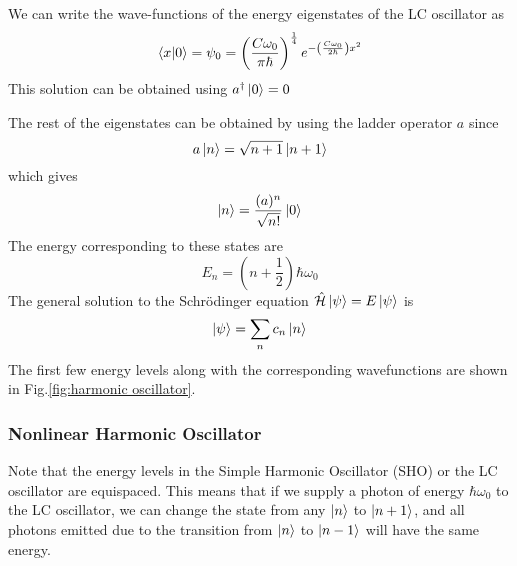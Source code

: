 We can write the wave-functions of the energy eigenstates of the LC oscillator as
\begin{equation}
\bra{x}\ket{0}=\psi_0=\left(\frac{C\omega_0}{\pi\hbar}\right)^\frac{1}{4}e^{-\left(\frac{C\omega_0}{2\hbar}\right)x^2}
\end{equation}
This solution can be obtained using $a^\dag\ket{0}=0$

The rest of the eigenstates can be obtained by using the ladder operator $a$ since
\begin{equation}
a\ket{n}=\sqrt{n+1}\ket{n+1}
\end{equation}
which gives
\begin{equation}
\ket{n}=\frac{(a)^n}{\sqrt{n!}}\ket{0}
\end{equation}
The energy corresponding to these states are
\begin{equation}
E_n=\left(n+\frac{1}{2}\right)\hbar\omega_0
\end{equation}
The general solution to the Schr\"{o}dinger equation $\hat{\mathcal{H}}\ket{\psi}=E\ket{\psi}$ is
\begin{equation}
\ket{\psi}=\sum_nc_n\ket{n}
\end{equation}
The first few energy levels along with the corresponding wavefunctions are shown in Fig.\ref{fig:harmonic oscillator}.


\subsubsection{Nonlinear Harmonic Oscillator}

Note that the energy levels in the Simple Harmonic Oscillator (SHO) or the LC oscillator are equispaced. This means that if we supply a photon of energy $\hbar\omega_0$ to the LC oscillator, we can change the state from any $\ket{n}$ to $\ket{n+1}$, and all photons emitted due to the transition from $\ket{n}$ to $\ket{n-1}$ will have the same energy.

